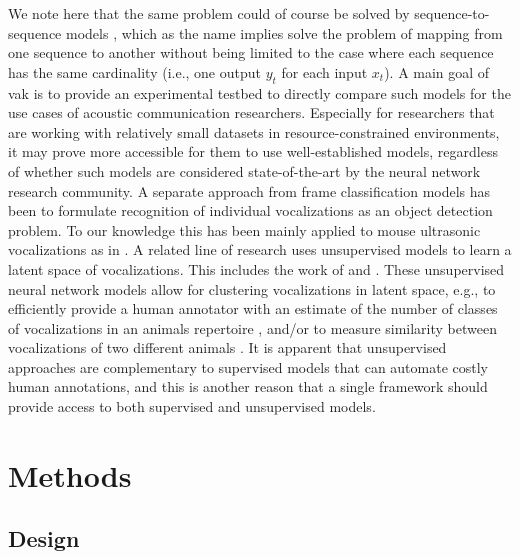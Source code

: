 We note here that the same problem could of course be solved by sequence-to-sequence models \cite{sutskeverSequenceSequenceLearning2014,vaswaniAttentionAllYou2017}, which as the name implies solve the problem of mapping from one sequence to another without being limited to the case where each sequence has the  same cardinality (i.e., one output $y_t$ for each input $x_t$). A main goal of vak is to provide an experimental testbed to directly compare such models for the use cases of acoustic communication researchers. Especially for researchers that are working with relatively small datasets \cite{arnaudImprovingWorkflowCrack2022} in resource-constrained environments, it may prove more accessible for them to use well-established models, regardless of whether such models are considered state-of-the-art by the neural network research community. A separate approach from frame classification models has been to formulate recognition of individual vocalizations as an object detection problem. To our knowledge this has been mainly applied to mouse ultrasonic vocalizations as in \cite{coffeyDeepSqueakDeepLearningbased2019}. A related line of research uses unsupervised models to learn a latent space of vocalizations. This includes the work of \cite{sainburgFindingVisualizingQuantifying2020} and \cite{goffinetLowdimensionalLearnedFeature2021}. These unsupervised neural network models allow for clustering vocalizations in latent space, e.g., to efficiently provide a human annotator with an estimate of the number of classes of vocalizations in an animals repertoire \cite{sainburgFindingVisualizingQuantifying2020}, and/or to measure similarity between vocalizations of two different animals \cite{goffinetLowdimensionalLearnedFeature2021}. It is apparent that unsupervised approaches are complementary to supervised models that can automate costly human annotations, and this is another reason that a single framework should provide access to both supervised and unsupervised models.

\section{Methods \label{sec:methods}}

\subsection{Design \label{subsec:design}}

